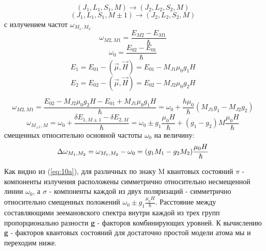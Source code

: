 $$(J_{1},L_{1},S_{1},M)\rightarrow(J_{2},L_{2},S_{2},M)$$
$$(J_{1},L_{1},S_{1},M \pm1)\rightarrow(J_{2},L_{2},S_{2},M)$$
с излучением частот $\omega_{M_1,M_2}$
$$\omega_{M2,M1}=\frac{E_{M2}-E_{M1}}{\hbar}$$
$$\omega_0=\frac{E_{02}-E_{01}}{\hbar}$$
$$E_1=E_{01}-(\vec{\mu},\vec{H})=E_{01}-M_{J1}\mu_0g_1H$$
$$E_2=E_{02}-(\vec{\mu},\vec{H})=E_{02}-M_{J2}\mu_0g_2H$$


\begin{equation} \tag{10a}
	\omega_{M2,M1}=\frac{E_{02}-M_{J2}\mu_0g_2H-E_{01}+M_{J1}\mu_0g_1H}{\hbar}=\omega_0+\frac{h\mu_0}{\hbar}(M_{J1}g_1-M_{J2}g_2)
	\label{eq:10a} 
\end{equation}
\begin{equation} \tag{10b}
	\omega_{M_{\pm1},M}=\omega_0 + \frac{\delta E_{1,M\pm1} - \delta E_{2,M}}{\hbar} = \omega_0 \pm g_1 \frac {\mu_0 H}{\hbar} +(g_1 - g_2)M\frac{\mu_0 H}{\hbar} 
	\label{eq:10b} 
\end{equation}
смещенных относительно основной частоты $\omega_0$ на величину:
	\begin{equation}
	\addtocounter{equation}{1}
	\Delta \omega_{M_1,M_2} = \omega_{M_1,M_2} - \omega_{0} = (g_{1} M_{1} - g_{2} M_{2})\frac{\mu_{0} H}{\hbar}
	\label{eq:11} 
\end{equation}

Как видно из (\ref{eq:10a}), для различных по знаку M квантовых состояний $\pi$ - компоненты излучения расположены симметрично относительно несмещенной линии $\omega_0$, а $\sigma$ - компоненты каждой из двух поляризаций - симметрично относительно смещенных положений $\omega_0 \pm g_{1} \frac{\mu_{0} H}{\hbar}$. Расстояние между составляющими зеемановского спектра внутри каждой из трех групп пропорционально разности \textbf{g} - факторов комбинирующих уровней. К вычислению \textbf{g} - факторов квантовых состояний для достаточно простой модели атома мы и переходим ниже.



% 